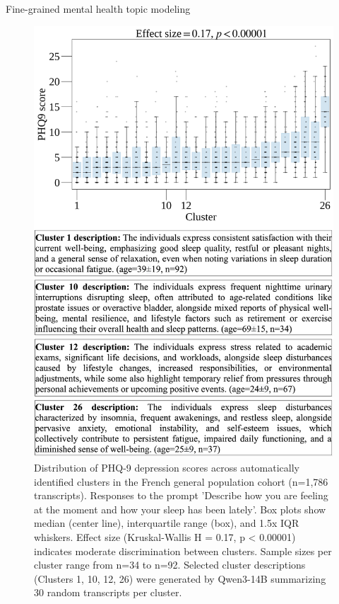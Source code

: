 \documentclass[handout,10pt]{beamer}
\begin{document}
\begin{frame}{Fine-grained mental health topic modeling}
  \begin{figure}
    \centering
    \includegraphics[scale=0.2]{img/topic_modeling/boxplot_description/popgen_description_larger.png}
    \caption{Distribution of PHQ-9 depression scores across automatically identified clusters in the French general population cohort (n=1,786 transcripts). Responses to the prompt 'Describe how you are feeling at the moment and how your sleep has been lately'. Box plots show median (center line), interquartile range (box), and 1.5x IQR whiskers. Effect size (Kruskal-Wallis H = 0.17, p < 0.00001) indicates moderate discrimination between clusters. Sample sizes per cluster range from n=34 to n=92. Selected cluster descriptions (Clusters 1, 10, 12, 26) were generated by Qwen3-14B summarizing 30 random transcripts per cluster.}
    \label{fig:popgen_description}
\end{figure}
\end{frame}
\end{document}
